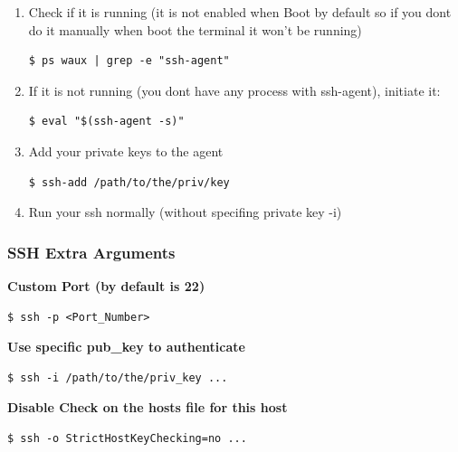 \documentclass{article}
\newenvironment{codetemplate}[1][]{%
  \mybasecolorbox[#1]
  \itshape
}{%
  \endmybasecolorbox
}
\begin{document}
\begin{enumerate}
    \item Check if it is running (it is not enabled when Boot by default so if you dont do it manually when boot the terminal it won't be running)
\begin{codetemplate}{}
\begin{verbatim}
$ ps waux | grep -e "ssh-agent"
\end{verbatim}
\end{codetemplate}

    \item If it is not running (you dont have any process with ssh-agent), initiate it:
\begin{codetemplate}{}
\begin{verbatim}
$ eval "$(ssh-agent -s)"
\end{verbatim}
\end{codetemplate}

    \item Add your private keys to the agent
\begin{codetemplate}{}
\begin{verbatim}
$ ssh-add /path/to/the/priv/key
\end{verbatim}
\end{codetemplate}

    \item Run your ssh normally (without specifing private key -i)
\end{enumerate}

\subsubsection{SSH Extra Arguments}

\textbf{Custom Port (by default is 22)}
\begin{codetemplate}{}
\begin{verbatim}
$ ssh -p <Port_Number>
\end{verbatim}
\end{codetemplate}

\textbf{Use specific pub\_key to authenticate}
\begin{codetemplate}{}
\begin{verbatim}
$ ssh -i /path/to/the/priv_key ...
\end{verbatim}
\end{codetemplate}

\textbf{Disable Check on the hosts file for this host}
\begin{codetemplate}{}
\begin{verbatim}
$ ssh -o StrictHostKeyChecking=no ...
\end{verbatim}
\end{codetemplate}
\end{document}
